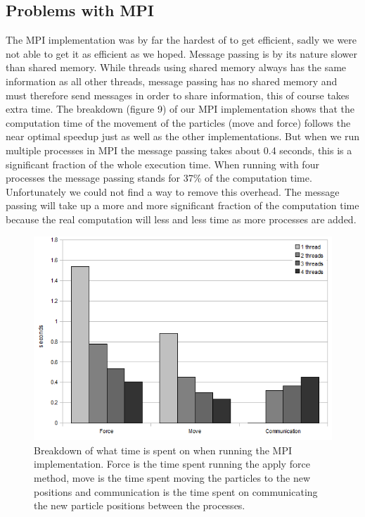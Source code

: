 \subsection{Problems with MPI}

The MPI implementation was by far the hardest of to get efficient, sadly we
were not able to get it as efficient as we hoped. Message passing is by its
nature slower than shared memory. While threads using shared memory always has
the same information as all other threads, message passing has no shared memory
and must therefore send messages in order to share information, this of course
takes extra time. The breakdown (figure 9) of our MPI implementation shows that
the computation time of the movement of the particles (move and force) follows
the near optimal speedup just as well as the other implementations. But when we
run multiple processes in MPI the message passing takes about 0.4 seconds, this
is a significant fraction of the whole execution time. When running with four
processes the message passing stands for 37\% of the computation time.
Unfortunately we could not find a way to remove this overhead. The message
passing will take up a more and more significant fraction of the computation
time because the real computation will less and less time as more processes are
added.

\begin{figure}[H]
    \label{breakdown}
	\includegraphics[width=\textwidth]{mpilol}
	\caption{Breakdown of what time is spent on when running the MPI implementation.
        Force is the time spent running the apply force method, move is the time
        spent moving the particles to the new positions and communication is the
        time spent on communicating the new particle positions between the
        processes.}
\end{figure}
